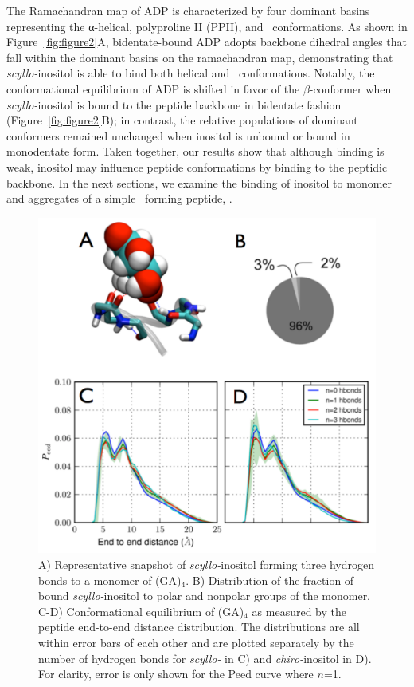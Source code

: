 The Ramachandran map of ADP is characterized by four dominant basins representing the α-helical, polyproline II (PPII), and \bsheet\ conformations.\cite{Neale:2008p87} As shown in Figure~\ref{fig:figure2}A, bidentate-bound ADP adopts backbone dihedral angles that fall within the dominant basins on the ramachandran map, demonstrating that \textit{scyllo-}inositol is able to bind both helical and \bsheet\ conformations. Notably, the conformational equilibrium of ADP is shifted in favor of the $\beta$-conformer when \textit{scyllo-}inositol is bound to the peptide backbone in bidentate fashion (Figure~\ref{fig:figure2}B); in contrast, the relative populations of dominant conformers remained unchanged when inositol is unbound or bound in monodentate form. Taken together, our results show that although binding is weak, inositol may influence peptide conformations by binding to the peptidic backbone. In the next sections, we examine the binding of inositol to monomer and aggregates of a simple \bsheet\ forming peptide, \gafour.

\begin{figure}[htbp]
  \centering
  \includegraphics[width=5in]{figures/results1/GA4_paper_figures_submitted-3-rearranged}
  \caption[Binding of \textit{scyllo-}inositol to the monomer of (GA)$_4$.]{A) Representative snapshot of \textit{scyllo-}inositol forming three hydrogen bonds to a monomer of (GA)$_4$. B) Distribution of the fraction of bound \textit{scyllo-}inositol to polar and nonpolar groups of the monomer. C-D) Conformational equilibrium of (GA)$_4$ as measured by the peptide end-to-end distance distribution. The distributions are all within error bars of each other and are plotted separately by the number of hydrogen bonds for \textit{scyllo-} in C) and \textit{chiro-}inositol in D). For clarity, error is only shown for the Peed curve where $n$=1.}
   \label{fig:figure3}
\end{figure}

